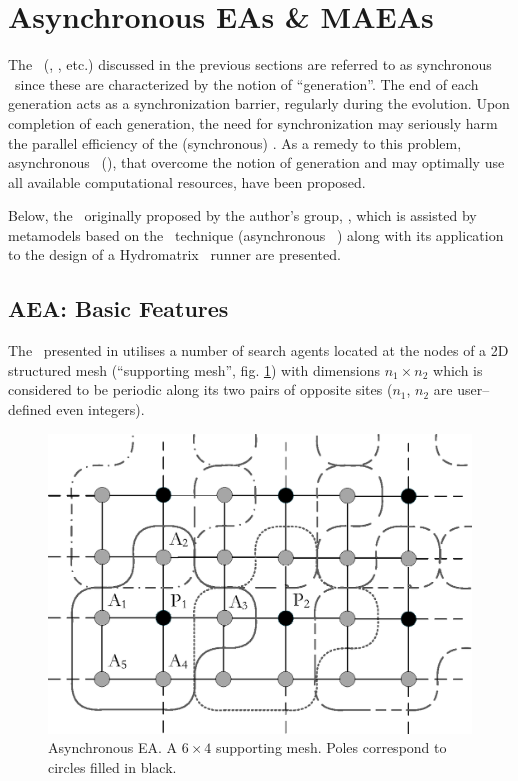 \documentclass{vki_ls}
\begin{document}
\section[Asynchronous EAs \& MAEAs]
{Asynchronous EAs \& MAEAs}
\label{s:AMAEA}

The \EAs\ (\MAEAs, \HMAEAs, etc.) discussed in the previous sections are referred to as synchronous \EAs\ since these are characterized by the notion of ``generation''. The end of each generation acts as a synchronization barrier, regularly during the evolution. 
Upon completion of each generation, the need for synchronization may seriously harm the parallel efficiency of the (synchronous) \EAs. As a remedy to this problem, asynchronous \EAs\ (\AEAs), that overcome the notion of generation and may optimally use all available computational resources, have been proposed.

Below, the \AEA\ originally proposed by the author's group, \cite{LTT_2_040}, which is assisted by metamodels based on the \IPE\ technique (asynchronous \MAEA\, \cite{LTT_2_045}) along with its application to the design of a Hydromatrix\textregistered~ runner are presented.

\subsection{AEA: Basic Features}
\label{ss:aea}

The \AEA\ presented in \cite{LTT_2_040} utilises a number of search agents located at the nodes of a 2D structured mesh (``supporting mesh'', fig. \ref{f:aeatopo}) with dimensions $n_1\!\times\! n_2$ which is considered to be periodic along its two pairs of opposite sites ($n_1$, $n_2$ are user--defined even integers). 
\begin{figure}[h!]
\centering
    \includegraphics[angle=0,scale=0.6]{topo.eps}
    \caption{Asynchronous EA. A $6\!\times\!4$ supporting mesh. Poles 
	     correspond to circles filled in black.}
    \label{f:aeatopo}
\end{figure}
\end{document}
